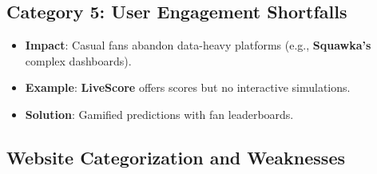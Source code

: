 \subsection{Category 5: User Engagement Shortfalls}
\begin{itemize}
\item \textbf{Impact}: Casual fans abandon data-heavy platforms (e.g., \textbf{Squawka’s} complex dashboards).
\item \textbf{Example}: \textbf{LiveScore} offers scores but no interactive simulations.
\item \textbf{Solution}: Gamified predictions with fan leaderboards.
\end{itemize}

\subsection{Website Categorization and Weaknesses}
